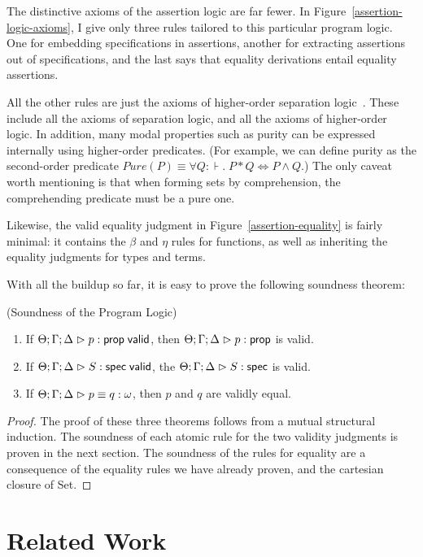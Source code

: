 The distinctive axioms of the assertion logic are far fewer. In
Figure~\ref{assertion-logic-axioms}, I give only three rules tailored
to this particular program logic. One for embedding specifications in
assertions, another for extracting assertions out of specifications,
and the last says that equality derivations entail equality
assertions. 

All the other rules are just the axioms of higher-order separation
logic~\cite{hosl}. These include all the axioms of separation logic,
and all the axioms of higher-order logic. In addition, many modal
properties such as purity can be expressed internally using
higher-order predicates. (For example, we can define purity as the
second-order predicate $\mathit{Pure}(P) \equiv \forall Q:\assert.\;P
* Q \iff P \land Q$.) The only caveat worth mentioning is that when
forming sets by comprehension, the comprehending predicate must be a
pure one.

Likewise, the valid equality judgment in
Figure~\ref{assertion-equality} is fairly minimal: it contains the
$\beta$ and $\eta$ rules for functions, as well as inheriting the
equality judgments for types and terms.

With all the buildup so far, it is easy to prove the following soundness
theorem:

\begin{theorem}{(Soundness of the Program Logic)}
  \begin{enumerate}
  \item If ${\Theta; \Gamma; \Delta} \vartriangleright {p} : \mathsf{prop} \;\mathsf{valid}$, then ${\Theta; \Gamma; \Delta} \vartriangleright {p} : {\mathsf{prop}}$ is valid.

  \item If ${\Theta; \Gamma; \Delta} \vartriangleright {S} : \mathsf{spec} \;\mathsf{valid}$, the ${\Theta; \Gamma; \Delta} \vartriangleright {S} : \mathsf{spec}$ is valid.

  \item If ${\Theta; \Gamma; \Delta} \vartriangleright {p} \equiv {q} : {\omega}$, then $p$ and $q$ are validly equal.
  \end{enumerate}
\end{theorem}

\begin{proof}
  The proof of these three theorems follows from a mutual structural
  induction.  The soundness of each atomic rule for the two validity
  judgments is proven in the next section. The soundness of the rules
  for equality are a consequence of the equality rules we have already
  proven, and the cartesian closure of Set.  
\end{proof}

\section{Related Work}

